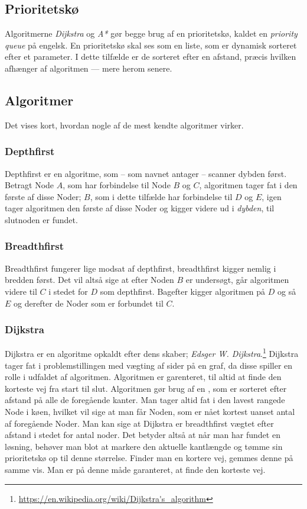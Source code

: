\documentclass[a4paper, 12pt]{article}
\begin{document}
\subsection{Prioritetskø}\label{subsec:pq}
Algoritmerne \textit{Dijkstra} og \textit{A*} gør begge brug af en prioritetskø, kaldet en \textit{priority queue} på engelsk. En prioritetskø skal ses som en liste, som er dynamisk sorteret efter et parameter. I dette tilfælde er de sorteret efter en afstand, præcis hvilken afhænger af algoritmen --- mere herom senere.

\subsection{Algoritmer}
Det vises kort, hvordan nogle af de mest kendte algoritmer virker.
\subsubsection{Depthfirst}
Depthfirst er en algoritme, som -- som navnet antager -- scanner dybden først. Betragt Node $A$, som har forbindelse til Node $B$ og $C$, algoritmen tager fat i den første af disse Noder; $B$, som i dette tilfælde har forbindelse til $D$ og $E$, igen tager algoritmen den første af disse Noder og kigger videre ud i \textit{dybden}, til slutnoden er fundet.
\subsubsection{Breadthfirst}
Breadthfirst fungerer lige modsat af depthfirst, breadthfirst kigger nemlig i bredden først. Det vil altså sige at efter Noden $B$ er undersøgt, går algoritmen videre til $C$ i stedet for $D$ som depthfirst. Bagefter kigger algoritmen på $D$ og så $E$ og derefter de Noder som er forbundet til $C$.
\subsubsection{Dijkstra}
Dijkstra er en algoritme opkaldt efter dens skaber; \textit{Edsger W. Dijkstra}.\footnote{\url{https://en.wikipedia.org/wiki/Dijkstra's_algorithm}} Dijkstra tager fat i problemstillingen med vægting af sider på en graf, da disse spiller en rolle i udfaldet af algoritmen. Algoritmen er garenteret, til altid at finde den korteste vej fra start til slut. Algoritmen gør brug af en , som er sorteret efter afstand på alle de foregående kanter. Man tager altid fat i den lavest rangede Node i køen, hvilket vil sige at man får Noden, som er nået kortest uanset antal af foregående Noder. Man kan sige at Dijkstra er breadthfirst vægtet efter afstand i stedet for antal noder. Det betyder altså at når man har fundet en løsning, behøver man blot at markere den aktuelle kantlængde og tømme sin prioritetskø op til denne størrelse. Finder man en kortere vej, gemmes denne på samme vis. Man er på denne måde garanteret, at finde den korteste vej.
\end{document}
